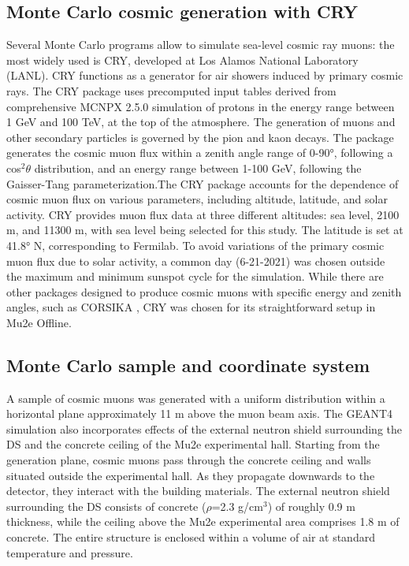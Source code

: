 \subsection{Monte Carlo cosmic generation with CRY}
Several Monte Carlo programs allow to simulate sea-level 
cosmic ray muons: the most widely used is CRY, developed 
at Los Alamos National Laboratory (LANL). CRY \cite{Hagmann2007CosmicraySG} functions as a generator for air showers 
induced by primary cosmic rays. The CRY package uses 
precomputed input tables derived from comprehensive 
MCNPX 2.5.0 simulation of protons in the energy range 
between 1 GeV and 100 TeV, at the top of the atmosphere.
The generation of muons and other secondary particles 
is governed by the pion and kaon decays. The package 
generates the cosmic muon flux within a zenith angle range 
of 0-90°, following a cos$^2 \theta$ distribution, and an 
energy range between 1-100 GeV, following the Gaisser-Tang
parameterization.The CRY package accounts for the 
dependence of cosmic muon flux on various parameters, 
including altitude, latitude, and solar activity. CRY 
provides muon flux data at three different altitudes: 
sea level, 2100 m, and 11300 m, with sea level being 
selected for this study. The latitude is set at 41.8° N, 
corresponding to Fermilab. To avoid variations of the 
primary cosmic muon flux due to solar activity, a 
common day (6-21-2021) was chosen outside the maximum and minimum 
sunspot cycle for the simulation. While there are other 
packages designed to produce cosmic muons with specific 
energy and zenith angles, such as CORSIKA \cite{Heck:1998vt},
CRY was chosen for its straightforward setup in Mu2e Offline.

\subsection{Monte Carlo sample and coordinate system }\label{genplane}
A sample of cosmic muons was generated with a uniform distribution within a
horizontal plane approximately 11 m above the muon beam axis. The GEANT4 
simulation also incorporates effects of the external neutron shield surrounding the DS 
and the concrete ceiling of the Mu2e experimental hall. Starting from the generation plane, 
cosmic muons pass through the concrete ceiling and walls situated outside the experimental hall. 
As they propagate downwards to the detector, they interact with the building materials. 
The external neutron shield surrounding the DS consists of concrete ($\rho$=2.3 g/cm$^3$) of  
roughly 0.9 m thickness, while the ceiling above the Mu2e experimental area comprises 1.8 m of concrete. 
The entire structure is enclosed within a volume of air at standard temperature and pressure.

